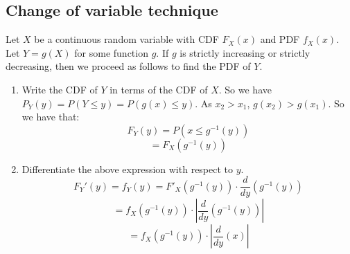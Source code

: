 

\subsection{Change of variable technique}
Let $X$ be a continuous random variable with CDF $F_X (x)$ and PDF $f_X (x)$. Let $Y = g(X)$ for some function $g$. If $g$ is strictly increasing or strictly decreasing, then we proceed as follows to find the PDF of $Y$.
\begin{enumerate}
    \item Write the CDF of $Y$ in terms of the CDF of $X$. So we have $P_Y (y) = P(Y \le y) = P(g(x) \le y)$. As $x_2 > x_1$, $g(x_2) > g(x_1)$. So we have that:
    $$F_Y (y) = P( x \le g^{-1} (y))$$
    $$ = F_X (g^{-1} (y))$$
    \item Differentiate the above expression with respect to $y$. 
    $$F_Y' (y) = f_Y (y) = F'_X (g^{-1} (y)) \cdot \frac{d}{dy} (g^{-1} (y))$$
    $$ = f_X (g^{-1}(y)) \cdot | \frac{d}{dy} (g^{-1} (y)) |$$
    $$= f_X (g^{-1} (y)) \cdot | \frac{d}{dy} (x) |$$
\end{enumerate}

